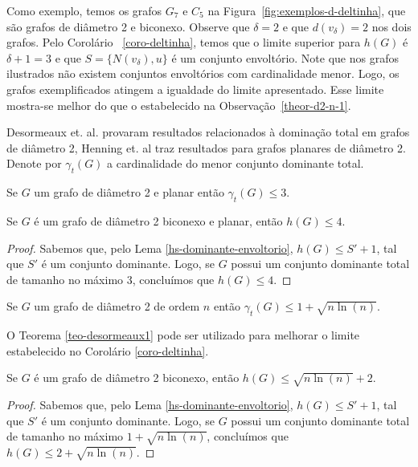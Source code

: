 Como exemplo, temos os grafos $G_7$ e $C_5$ na Figura~\ref{fig:exemplos-d-deltinha}, que são grafos de diâmetro 2 e biconexo. Observe que $\delta=2$ e que $d(v_{\delta})=2$ nos dois grafos. Pelo Corolário ~\ref{coro-deltinha}, temos que o limite superior para $h(G)$ é $\delta+1=3$ e que $S=\{N(v_{\delta}), u\}$ é um conjunto envoltório. Note que nos grafos ilustrados não existem conjuntos envoltórios com cardinalidade menor. Logo, os grafos exemplificados atingem a igualdade do limite apresentado. Esse limite mostra-se melhor do que o estabelecido na Observação~\ref{theor-d2-n-1}.

Desormeaux et. al. \cite{Desormeaux2013} provaram resultados relacionados à dominação total em grafos de diâmetro 2, Henning et. al \cite{Henning2009} traz resultados para grafos planares de diâmetro 2.  Denote por $\gamma_t(G)$ a cardinalidade do menor conjunto dominante total.

\begin{theorem}\cite{Henning2009} 
\label{teo-desormeaux0}
Se $G$ um grafo de diâmetro 2 e planar então $\gamma_t(G) \leq 3$. 
\end{theorem}

\begin{coro} 
Se $G$ é um grafo de diâmetro 2 biconexo e planar, então $h(G) \le  4$.
\label{coro-domina0}
\end{coro}
\begin{proof}
Sabemos que, pelo Lema \ref{hs-dominante-envoltorio}, $h(G) \leq S' + 1$, tal que $S'$ é um conjunto dominante. Logo, se $G$ possui um conjunto dominante total de tamanho no máximo $3$, concluímos que $h(G) \leq 4$.
\end{proof}

\begin{theorem}\cite{Desormeaux2013} 
\label{teo-desormeaux1}
Se $G$ um grafo de diâmetro 2 de ordem $n$ então $\gamma_t(G) \leq 1 + \sqrt{n \ln(n)}$. 
\end{theorem}

O Teorema \ref{teo-desormeaux1} pode ser utilizado para melhorar o limite estabelecido no Corolário \ref{coro-deltinha}.

\begin{coro} 
Se $G$ é um grafo de diâmetro 2  biconexo, então $h(G) \le  \sqrt{n\ln(n)} + 2$.
\label{coro-domina1}
\end{coro}
\begin{proof}
Sabemos que, pelo Lema \ref{hs-dominante-envoltorio}, $h(G) \leq S' + 1$, tal que $S'$ é um conjunto dominante. Logo, se $G$ possui um conjunto dominante total de tamanho no máximo $1+ \sqrt{n \ln(n)}$, concluímos que $h(G) \leq 2+ \sqrt{n \ln(n)}$.
\end{proof}

